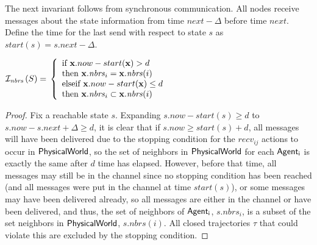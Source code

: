 \documentclass[10pt, conference, compsocconf]{IEEEtran}
\begin{document}
The next invariant follows from synchronous communication.
All nodes receive messages about the state information from time $next - \Delta$ before time $next$.
Define the time for the last send with respect to state $s$ as $start(s) = s.next - \Delta$.
\begin{inv}
\label{inv:send}

${\cal I}_{\mathit{nbrs}}\left(S\right) = \\
	\left\{
		\begin{array}{l}
			\textrm{if } {\bf x}.now - start({\bf x}) > d \\ \textrm{then } {\bf x}.\mathit{nbrs}_i = {\bf x}.\mathit{nbrs}(i)\\
			\textrm{elseif } {\bf x}.now - start({\bf x}) \leq d \\ \textrm{then } {\bf x}.\mathit{nbrs}_i \subset {\bf x}.\mathit{nbrs}(i)\\
		\end{array}
	\right.$
\end{inv}
\begin{proof}
Fix a reachable state $s$.  Expanding $s.now - start(s) \geq d$ to $s.now - s.next + \Delta \geq d$, it is clear that if $s.now \geq start(s) + d$, all messages will have been delivered due to the stopping condition for the $recv_{ij}$ actions to occur in ${\operatorname{\mathsf{PhysicalWorld}}}$, so the set of neighbors in ${\operatorname{\mathsf{PhysicalWorld}}}$ for each ${\operatorname{\mathsf{Agent_i}}}$ is exactly the same after $d$ time has elapsed.  However, before that time, all messages may still be in the channel since no stopping condition has been reached (and all messages were put in the channel at time $start(s)$), or some messages may have been delivered already, so all messages are either in the channel or have been delivered, and thus, the set of neighbors of ${\operatorname{\mathsf{Agent_i}}}$, $s.nbrs_i$, is a subset of the set neighbors in ${\operatorname{\mathsf{PhysicalWorld}}}$, $s.nbrs(i)$.  All closed trajectories $\tau$ that could violate this are excluded by the stopping condition.
\end{proof}
\end{document}
